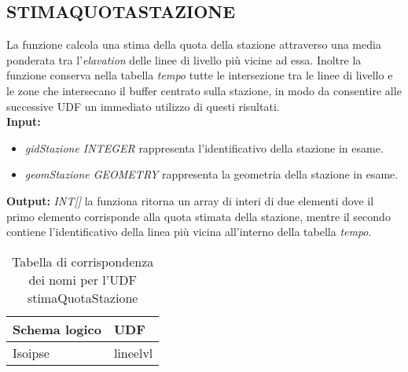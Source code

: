 \subsection{\textbf{STIMAQUOTASTAZIONE}}
La funzione calcola una stima della quota della stazione attraverso una media ponderata tra l'\textit{elavation} delle linee di livello più vicine ad essa. Inoltre la funzione conserva nella tabella \textit{tempo} tutte le intersezione tra le linee di livello e le zone che intersecano il buffer centrato sulla stazione, in modo da consentire alle successive UDF un immediato utilizzo di questi risultati.\\
\textbf{Input:} 
\begin{itemize}
\item \textit{gidStazione INTEGER} rappresenta l'identificativo della stazione in esame.
\item \textit{geomStazione GEOMETRY} rappresenta la geometria della stazione in esame.
\end{itemize}
\textbf{Output:} \textit{INT[]} la funziona ritorna un array di interi di due elementi dove il primo elemento corrisponde alla quota stimata della stazione, mentre il secondo contiene l'identificativo della linea più vicina all'interno della tabella \textit{tempo}.

\begin{table}[h]
\centering
\caption{Tabella di corrispondenza dei nomi per l'UDF stimaQuotaStazione}
\label{mapTb2}
\begin{tabular}{|l|l|}
\hline
Schema logico & UDF      \\ \hline
Isoipse       & lineelvl \\ \hline
\end{tabular}
\end{table} 

